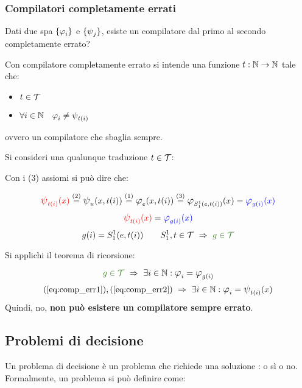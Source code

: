 \subsubsection*{Compilatori completamente errati}
Dati due spa $\sistProg$ e $\sistProgW$, esiste un compilatore dal primo al secondo
completamente errato?

Con compilatore completamente errato si intende una funzione $t:\mathbb{N}\to\mathbb{N}$ tale che:
\begin{itemize}
    \item $t\in\mathcal{T}$
    \item $\forall i\in\N \quad \semRAM_i\neq\semWHILE_{t(i)}$
\end{itemize}
ovvero un compilatore che sbaglia sempre.

Si consideri una qualunque traduzione $t\in\mathcal{T}$:
\begin{center}
    Con i (3) assiomi si può dire che:  
\end{center}
$$
{\color{red}\semWHILE_{t(i)}(x)} \overset{(2)}{=}
\semWHILE_u(x,t(i)) \overset{(1)}{=}
\semRAM_e(x,t(i)) \overset{(3)}{=}
\semRAM_{S_1^1(e,t(i))}(x) = {\color{blue}\semRAM_{g(i)}(x)} $$
\begin{equation}\label{eq:comp_err1}
    {\color{red}\semWHILE_{t(i)}(x)} = 
    {\color{blue}\semRAM_{g(i)}(x)}
\end{equation} \vspace{.6em}
$$ g(i) = S_1^1(e,t(i))\qquad S_1^1,t\in\ricTot \ \Rightarrow \
{\color{OliveGreen}g\in\ricTot} $$
\begin{center}
    Si applichi il teorema di ricorsione:  
\end{center}
\begin{equation}\label{eq:comp_err2}
    {\color{OliveGreen}g\in\ricTot} \ \Rightarrow \ 
    \exists i\in\N:\semRAM_i=\semRAM_{g(i)} \end{equation}
\vspace{.6em}
$$ (\ref{eq:comp_err1}),(\ref{eq:comp_err2})\ \Rightarrow \ 
\exists i\in\N : \semRAM_i = \semWHILE_{t(i)}(x) $$
Quindi, no, \textbf{non può esistere un compilatore sempre errato}.

\subsection{Problemi di decisione}
Un problema di decisione è un problema che richiede una soluzione :
o sì o no.
Formalmente, un problema si può definire come:

